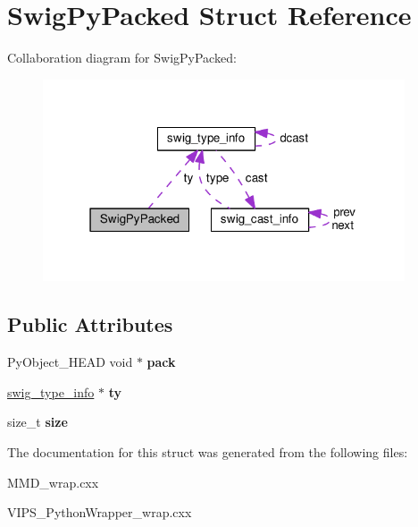 \hypertarget{structSwigPyPacked}{}\section{Swig\+Py\+Packed Struct Reference}
\label{structSwigPyPacked}


Collaboration diagram for Swig\+Py\+Packed\+:\nopagebreak
\begin{figure}[H]
\begin{center}
\leavevmode
\includegraphics[width=304pt]{structSwigPyPacked__coll__graph}
\end{center}
\end{figure}
\subsection*{Public Attributes}
\begin{DoxyCompactItemize}
\item 
Py\+Object\+\_\+\+H\+E\+AD void $\ast$ {\bfseries pack}\hypertarget{structSwigPyPacked_a90bf060d4d9b7924acc8bc81525244d4}{}\label{structSwigPyPacked_a90bf060d4d9b7924acc8bc81525244d4}

\item 
\hyperlink{structswig__type__info}{swig\+\_\+type\+\_\+info} $\ast$ {\bfseries ty}\hypertarget{structSwigPyPacked_ae179dcfa49ddb42652601334198d4271}{}\label{structSwigPyPacked_ae179dcfa49ddb42652601334198d4271}

\item 
size\+\_\+t {\bfseries size}\hypertarget{structSwigPyPacked_aed2bfb8fb3c9f804c386215db63921cb}{}\label{structSwigPyPacked_aed2bfb8fb3c9f804c386215db63921cb}

\end{DoxyCompactItemize}


The documentation for this struct was generated from the following files\+:\begin{DoxyCompactItemize}
\item 
M\+M\+D\+\_\+wrap.\+cxx\item 
V\+I\+P\+S\+\_\+\+Python\+Wrapper\+\_\+wrap.\+cxx\end{DoxyCompactItemize}
